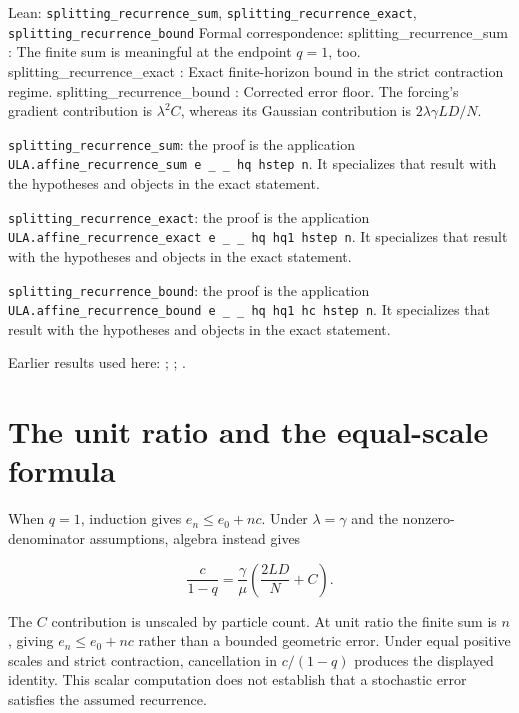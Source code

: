 \documentclass[11pt,a4paper]{article}
\begin{document}
\begin{leanbox}{Lean: \texttt{splitting\_\allowbreak{}recurrence\_\allowbreak{}sum}, \texttt{splitting\_\allowbreak{}recurrence\_\allowbreak{}exact}, \texttt{splitting\_\allowbreak{}recurrence\_\allowbreak{}bound}}
Formal correspondence: splitting\_recurrence\_sum : The finite sum is meaningful at the endpoint \(q=1\), too. splitting\_recurrence\_exact : Exact finite-horizon bound in the strict contraction regime. splitting\_recurrence\_bound : Corrected error floor. The forcing's gradient contribution is \(\lambda^2C\), whereas its Gaussian contribution is \(2\lambda\gamma LD/N\).



\texttt{splitting\_\allowbreak{}recurrence\_\allowbreak{}sum}: the proof is the application \texttt{ULA.\allowbreak{}affine\_\allowbreak{}recurrence\_\allowbreak{}sum e \_\allowbreak{} \_\allowbreak{} hq hstep n}. It specializes that result with the hypotheses and objects in the exact statement.



\texttt{splitting\_\allowbreak{}recurrence\_\allowbreak{}exact}: the proof is the application \texttt{ULA.\allowbreak{}affine\_\allowbreak{}recurrence\_\allowbreak{}exact e \_\allowbreak{} \_\allowbreak{} hq hq1 hstep n}. It specializes that result with the hypotheses and objects in the exact statement.



\texttt{splitting\_\allowbreak{}recurrence\_\allowbreak{}bound}: the proof is the application \texttt{ULA.\allowbreak{}affine\_\allowbreak{}recurrence\_\allowbreak{}bound e \_\allowbreak{} \_\allowbreak{} hq hq1 hc hstep n}. It specializes that result with the hypotheses and objects in the exact statement.
\end{leanbox}


Earlier results used here: \cite[Section~3.15.1]{LangevinLean2026ULASC}; \cite[Section~3.15.2]{LangevinLean2026ULASC}; \cite[Section~3.15.3]{LangevinLean2026ULASC}.

\section{\texorpdfstring{The unit ratio and the equal-scale formula}{The unit ratio and the equal-scale formula}}


When \(q=1\), induction gives \(e_n\le e_0+nc\). Under \(\lambda=\gamma\) and the nonzero-denominator assumptions, algebra instead gives

\[\frac c{1-q}=\frac\gamma\mu\left(\frac{2LD}{N}+C\right).\]

The \(C\) contribution is unscaled by particle count. At unit ratio the finite sum is \(n\), giving \(e_n\le e_0+nc\) rather than a bounded geometric error. Under equal positive scales and strict contraction, cancellation in \(c/(1-q)\) produces the displayed identity. This scalar computation does not establish that a stochastic error satisfies the assumed recurrence.
\end{document}
